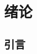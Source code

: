 \documentclass[12pt,a4paper,oneside,openany]{book}
\begin{document}
\tableofcontents
\chapter{绪论}

\section{引言}
\end{document}
